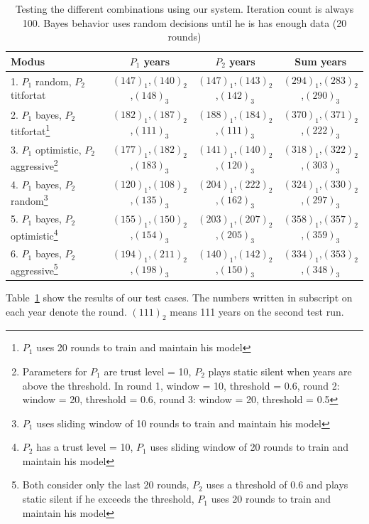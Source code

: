 \documentclass{acm_proc_article-sp}
\begin{document}
\begin{table}
\centering
\begin{tabular}{ l | c | c | c }
Modus & $P_1$ years & $P_2$ years & Sum years \\
\hline
1. $P_1$ random, $P_2$ titfortat & 
   $(147)_1$,$(140)_2$,$(148)_3$ &
   $(147)_1$,$(143)_2$,$(142)_3$ &
   $(294)_1$,$(283)_2$,$(290)_3$ \\
\hline
2. $P_1$ bayes, $P_2$ titfortat\footnote{$P_1$ uses 20 rounds to train and maintain his model} & 
   $(182)_1$,$(187)_2$,$(111)_3$ &
   $(188)_1$,$(184)_2$,$(111)_3$ &
   $(370)_1$,$(371)_2$,$(222)_3$ \\
   
\hline
3. $P_1$ optimistic, $P_2$ aggressive\footnote{
Parameters for $P_1$ are trust level = 10, $P_2$ plays static silent when years are above the threshold. In round 1, window = 10, threshold = 0.6, round 2: window = 20, threshold = 0.6,
round 3: window = 20, threshold = 0.5
} & 
   $(177)_1$,$(182)_2$,$(183)_3$ &
   $(141)_1$,$(140)_2$,$(120)_3$ &
   $(318)_1$,$(322)_2$,$(303)_3$ \\
\hline
4. $P_1$ bayes, $P_2$ random\footnote{$P_1$ uses sliding window of 10 rounds to train and maintain his model} & 
   $(120)_1$,$(108)_2$,$(135)_3$ &
   $(204)_1$,$(222)_2$,$(162)_3$ &
   $(324)_1$,$(330)_2$,$(297)_3$ \\
   
\hline
5. $P_1$ bayes, $P_2$ optimistic\footnote{$P_2$ has a trust level = 10, $P_1$ uses sliding window of 20 rounds to train and maintain his model} & 
   $(155)_1$,$(150)_2$,$(154)_3$ &
   $(203)_1$,$(207)_2$,$(205)_3$ &
   $(358)_1$,$(357)_2$,$(359)_3$ \\
   
\hline
6. $P_1$ bayes, $P_2$ aggressive\footnote{Both consider only the last 20 rounds, $P_2$ uses a threshold of 0.6 and plays static silent if he exceeds the threshold, $P_1$ uses 20 rounds to train and maintain his model} & 
   $(194)_1$,$(211)_2$,$(198)_3$ &
   $(140)_1$,$(142)_2$,$(150)_3$ &
   $(334)_1$,$(353)_2$,$(348)_3$ \\
   
\end{tabular}
\caption{Testing the different combinations using our system. Iteration count is always 100. Bayes behavior uses random decisions until he is has enough data (20 rounds)}
\label{tab:tests}
\end{table}

Table~\ref{tab:tests} show the results of our test cases. The numbers written in subscript on each year denote the round. $(111)_2$ means 111 years on the second test run.
\end{document}
